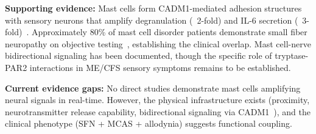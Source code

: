 \begin{open_question}
\textbf{Supporting evidence:} Mast cells form CADM1-mediated adhesion structures with sensory neurons that amplify degranulation (~2-fold) and IL-6 secretion (~3-fold)~\cite{Magadmi2019}. Approximately 80\% of mast cell disorder patients demonstrate small fiber neuropathy on objective testing~\cite{Novak2022}, establishing the clinical overlap. Mast cell-nerve bidirectional signaling has been documented, though the specific role of tryptase-PAR2 interactions in ME/CFS sensory symptoms remains to be established.

\textbf{Current evidence gaps:} No direct studies demonstrate mast cells amplifying neural signals in real-time. However, the physical infrastructure exists (proximity, neurotransmitter release capability, bidirectional signaling via CADM1~\cite{Magadmi2019}), and the clinical phenotype (SFN + MCAS + allodynia) suggests functional coupling.
\end{open_question}

